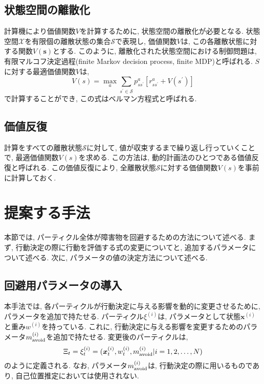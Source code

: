 \subsection{状態空間の離散化}
計算機により価値関数$V$を計算するために, 状態空間の離散化が必要となる. 
状態空間$\mathcal{X}$を有限個の離散状態の集合$\mathcal{S}$で表現し, 
価値関数$V$は, この各離散状態に対する関数$V(\bm{s})$とする. 
このように, 離散化された状態空間における制御問題は, 有限マルコフ決定過程(finite Markov decision process, finite MDP)と呼ばれる. 
$S$に対する最適価値関数$V$は, 
\begin{equation}
\label{bellman equation}
  V(s) = \max_{a} \sum_{s^{\prime} \in \mathcal{S}}
         p^{a}_{ss^{\prime}} \left[ r^{a}_{ss^{\prime}} + V(s^{\prime}) \right]
\end{equation}
で計算することができ, この式はベルマン方程式と呼ばれる. 

\subsection{価値反復}
計算をすべての離散状態$\mathcal{S}$に対して, 値が収束するまで繰り返し行っていくことで, 最適価値関数$V(s)$を求める. 
この方法は, 動的計画法のひとつである価値反復と呼ばれる. 
この価値反復により, 全離散状態$\mathcal{S}$に対する価値関数$V(s)$を事前に計算しておく. 


\section{提案する手法} \label{section:回避重み}
本節では, パーティクル全体が障害物を回避するための方法について述べる. 
まず, 行動決定の際に行動を評価する式の変更についてと, 追加するパラメータについて述べる. 
次に, パラメータの値の決定方法について述べる. 

\subsection{回避用パラメータの導入}
本手法では, 各パーティクルが行動決定に与える影響を動的に変更させるために, パラメータを追加で持たせる. 
パーティクル$\xi^{(i)}$は,  パラメータとして状態$\bm{x}^{(i)}$と重み$w^{(i)}$を持っている. 
これに, 行動決定に与える影響を変更するためのパラメータ$m^{(i)}_{\rm avoid}$を追加で持たせる. 
変更後のパーティクルは, 
\begin{equation}
\label{particles}
  \Xi_{t} = {\xi^{(i)}_{t} =
  (\bm{x}^{(i)}_{t}, w^{(i)}_{t}, m^{(i)}_{\rm avoid} |i = 1,2,\dots,N) }
\end{equation}
のように定義される. 
なお, パラメータ$m^{(i)}_{\rm avoid}$は, 行動決定の際に用いるものであり, 自己位置推定においては使用されない. 

